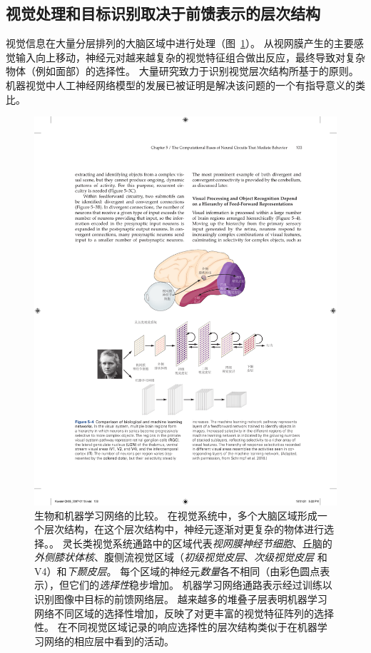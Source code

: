 \subsection{视觉处理和目标识别取决于前馈表示的层次结构}

视觉信息在大量分层排列的大脑区域中进行处理（图~\ref{fig:5_4}）。
从视网膜产生的主要感觉输入向上移动，神经元对越来越复杂的视觉特征组合做出反应，最终导致对复杂物体（例如面部）的选择性。
大量研究致力于识别视觉层次结构所基于的原则。
机器视觉中人工神经网络模型的发展已被证明是解决该问题的一个有指导意义的类比。


\begin{figure}[htbp]
	\centering
	\includegraphics[width=1.0\linewidth]{chap05/fig_5_4}
	\caption{生物和机器学习网络的比较。
		在视觉系统中，多个大脑区域形成一个层次结构，在这个层次结构中，神经元逐渐对更复杂的物体进行选择。。
		灵长类视觉系统通路中的区域代表\textit{视网膜神经节细胞}、丘脑的\textit{外侧膝状体核}、腹侧流视觉区域（\textit{初级视觉皮层}、\textit{次级视觉皮层} 和 V4）和\textit{下颞皮层}。
		每个区域的神经元\textit{数量}各不相同（由彩色圆点表示），但它们的\textit{选择性}稳步增加。
		机器学习网络通路表示经过训练以识别图像中目标的前馈网络层。
		越来越多的堆叠子层表明机器学习网络不同区域的选择性增加，反映了对更丰富的视觉特征阵列的选择性。
		在不同视觉区域记录的响应选择性的层次结构类似于在机器学习网络的相应层中看到的活动\cite{schrimpf2018brain}。}
	\label{fig:5_4}
\end{figure}



